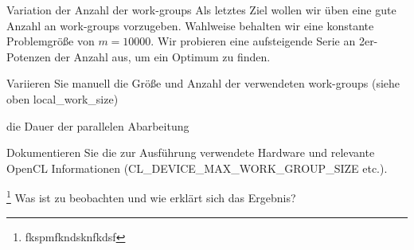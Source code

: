 \documentclass[
ngerman,
subtask=ruled %
]{tudaexercise}
\begin{document}
	\begin{task} {Variation der Anzahl der work-groups}
		Als letztes Ziel wollen wir üben eine gute Anzahl an work-groups vorzugeben. Wahlweise behalten wir eine konstante Problemgröße von $m = 10000$.
		Wir probieren eine aufsteigende Serie an 2er-Potenzen der Anzahl aus, um ein Optimum zu finden.
		
		Variieren Sie manuell die Größe und Anzahl der verwendeten work-groups (siehe oben local\_work\_size) 
		
		die Dauer der parallelen Abarbeitung
		
		Dokumentieren Sie die zur Ausführung verwendete Hardware und relevante OpenCL Informationen (CL\_DEVICE\_MAX\_WORK\_GROUP\_SIZE etc.).
		
		\footnote{fkspmfkndsknfkdsf}
		Was ist zu beobachten und wie erklärt sich das Ergebnis?
		
		
	\end{task}


	
	
\end{document}
